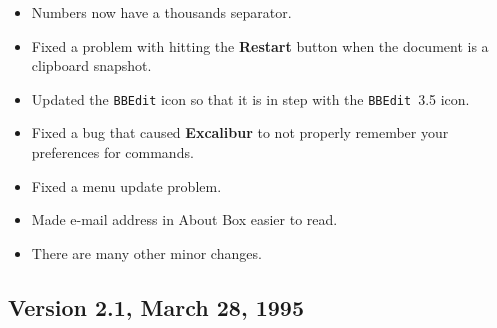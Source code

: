 \documentclass[11pt,titlepage]{article}
\newcommand{\ex}{\textbf{Excalibur}}
\begin{document}
\begin{itemize}
\item Numbers now have a thousands separator.

\item Fixed a problem with hitting the \textbf{Restart} button when
  the document is a clipboard snapshot.

\item Updated the \texttt{BBEdit} icon so that it is in step with the
  \texttt{BBEdit}~3.5 icon.

\item Fixed a bug that caused \ex{} to not properly remember your
  preferences for commands.

\item Fixed a menu update problem.

\item Made e-mail address in About Box easier to read.

\item There are many other minor changes.

\end{itemize}

\subsection{Version 2.1, March 28, 1995}
\end{document}
